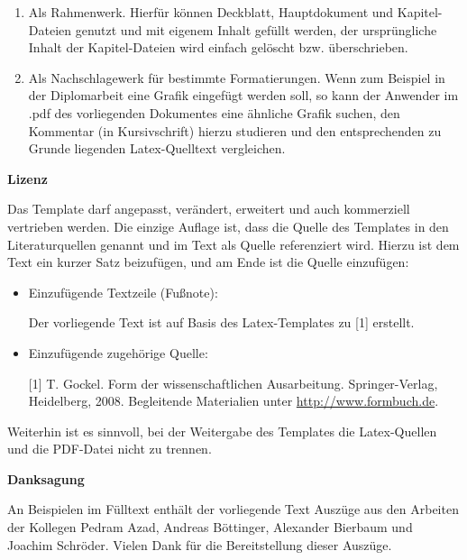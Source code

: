 \begin{enumerate}
\item Als Rahmenwerk. Hierfür können Deckblatt, Hauptdokument und Kapitel-Dateien genutzt und mit eigenem Inhalt gefüllt werden, der ursprüngliche Inhalt der Kapitel-Dateien wird einfach gelöscht bzw. überschrieben.
\item Als Nachschlagewerk für bestimmte Formatierungen. Wenn zum Beispiel in der Diplomarbeit eine Grafik eingefügt werden soll, so kann der Anwender im .pdf des vorliegenden Dokumentes eine ähnliche Grafik suchen, den Kommentar (in Kursivschrift) hierzu studieren und den entsprechenden zu Grunde liegenden Latex-Quelltext vergleichen.

\end{enumerate}

\clearpage
\color{darkred}



\textbf{Lizenz}

Das Template darf angepasst, verändert, erweitert und auch kommerziell vertrieben werden. Die einzige Auf\/lage ist, dass die Quelle des Templates in den Literaturquellen genannt und im Text als Quelle referenziert wird. Hierzu ist dem Text ein kurzer Satz beizufügen, und am Ende ist die Quelle einzufügen:

\begin{itemize}
\item Einzufügende Textzeile (Fußnote):

Der vorliegende Text ist auf Basis des Latex-Templates zu [1] erstellt.

\item Einzufügende zugehörige Quelle:

[1] T. \mbox{Gockel}. Form der wissenschaftlichen Ausarbeitung. Springer-Verlag, Heidelberg, 2008. Begleitende Materialien unter \url{http://www.formbuch.de}.

\end{itemize}

Weiterhin ist es sinnvoll, bei der Weitergabe des Templates die Latex-Quellen und die PDF-Datei nicht zu trennen.


\medskip
\medskip


\textbf{Danksagung}

An Beispielen im Fülltext enthält der vorliegende Text Auszüge aus den Arbeiten der Kollegen Pedram Azad, Andreas Böttinger, Alexander Bierbaum und Joachim Schröder. Vielen Dank für die Bereitstellung dieser Auszüge.

